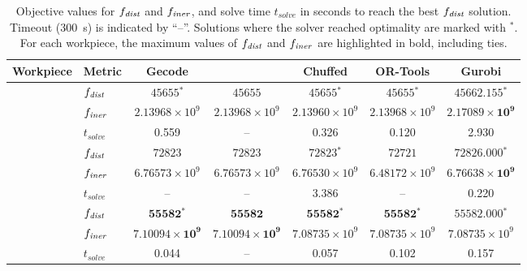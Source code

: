 \begin{table}[!b]
	\centering
	\footnotesize
	\caption{Objective values for $\fdist$ and $\finer$, and solve time $t_{solve}$ in seconds to reach the best $\fdist$ solution. Timeout (300~s) is indicated by ``--''. Solutions where the solver reached optimality are marked with $^*$. For each workpiece, the maximum values of $\fdist$ and $\finer$ are highlighted in bold, including ties.}
	\label{tab:objective_runtime}
	\setlength{\tabcolsep}{2pt}
	\begin{tabular}{llccccc}
		\toprule
		Workpiece & Metric & Gecode & \lns & Chuffed & OR-Tools & Gurobi \\
		\midrule
		
		 & $\fdist$ & $45655{}^*$ & $45655$ & $45655{}^*$ & $45655{}^*$ & $\mathbf{45662.155{}^*}$ \\
		& $\finer$ & $2.13968\times 10^{9}$ & $2.13968\times 10^{9}$ & $2.13960\times 10^{9}$ & $2.13968\times 10^{9}$ & $\mathbf{2.17089\times 10^{9}}$ \\
		& $t_{solve}$ & 0.559 & -- & 0.326 & 0.120 & 2.930 \\
		\midrule
		
		 & $\fdist$ & $72823$ & $72823$ & $72823{}^*$ & $72721$ & $\mathbf{72826.000{}^*}$ \\
		& $\finer$ & $6.76573\times 10^{9}$ & $6.76573\times 10^{9}$ & $6.76530\times 10^{9}$ & $6.48172\times 10^{9}$ & $\mathbf{6.76638\times 10^{9}}$ \\
		& $t_{solve}$ & -- & -- & 3.386 & -- & 0.220 \\
		\midrule
		
		 & $\fdist$ & $\mathbf{55582{}^*}$ & $\mathbf{55582}$ & $\mathbf{55582{}^*}$ & $\mathbf{55582{}^*}$ & $\mathbf{55582.000{}^*}$ \\
		& $\finer$ & $\mathbf{7.10094\times 10^{9}}$ & $\mathbf{7.10094\times 10^{9}}$ & $7.08735\times 10^{9}$ & $7.08735\times 10^{9}$ & $7.08735\times 10^{9}$ \\
		& $t_{solve}$ & 0.044 & -- & 0.057 & 0.102 & 0.157 \\
		\midrule
		

\end{tabular}
\end{table}
